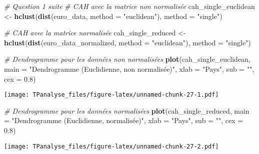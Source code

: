 \documentclass[
]{article}
\newenvironment{Shaded}{\begin{snugshade}}{\end{snugshade}}
\newcommand{\AttributeTok}[1]{\textcolor[rgb]{0.13,0.29,0.53}{#1}}
\newcommand{\CommentTok}[1]{\textcolor[rgb]{0.56,0.35,0.01}{\textit{#1}}}
\newcommand{\FloatTok}[1]{\textcolor[rgb]{0.00,0.00,0.81}{#1}}
\newcommand{\FunctionTok}[1]{\textcolor[rgb]{0.13,0.29,0.53}{\textbf{#1}}}
\newcommand{\NormalTok}[1]{#1}
\newcommand{\OtherTok}[1]{\textcolor[rgb]{0.56,0.35,0.01}{#1}}
\newcommand{\StringTok}[1]{\textcolor[rgb]{0.31,0.60,0.02}{#1}}
\begin{document}
\begin{Shaded}
\begin{Highlighting}[]
\CommentTok{\# Question 1 suite }
\CommentTok{\# CAH avec la matrice non normalisée}
\NormalTok{cah\_single\_euclidean }\OtherTok{\textless{}{-}} \FunctionTok{hclust}\NormalTok{(}\FunctionTok{dist}\NormalTok{(euro\_data, }\AttributeTok{method =} \StringTok{"euclidean"}\NormalTok{), }\AttributeTok{method =} \StringTok{"single"}\NormalTok{)}

\CommentTok{\# CAH avec la matrice normalisée}
\NormalTok{cah\_single\_reduced }\OtherTok{\textless{}{-}} \FunctionTok{hclust}\NormalTok{(}\FunctionTok{dist}\NormalTok{(euro\_data\_normalized, }\AttributeTok{method =} \StringTok{"euclidean"}\NormalTok{), }\AttributeTok{method =} \StringTok{"single"}\NormalTok{)}

\CommentTok{\# Dendrogramme pour les données non normalisées}
\FunctionTok{plot}\NormalTok{(cah\_single\_euclidean, }
     \AttributeTok{main =} \StringTok{"Dendrogramme (Euclidienne, non normalisée)"}\NormalTok{, }
     \AttributeTok{xlab =} \StringTok{"Pays"}\NormalTok{, }\AttributeTok{sub =} \StringTok{""}\NormalTok{, }\AttributeTok{cex =} \FloatTok{0.8}\NormalTok{)}
\end{Highlighting}
\end{Shaded}

\texttt{[image: TPanalyse\_files/figure-latex/unnamed-chunk-27-1.pdf]}

\begin{Shaded}
\begin{Highlighting}[]
\CommentTok{\# Dendrogramme pour les données normalisées}
\FunctionTok{plot}\NormalTok{(cah\_single\_reduced, }
     \AttributeTok{main =} \StringTok{"Dendrogramme (Euclidienne, normalisée)"}\NormalTok{, }
     \AttributeTok{xlab =} \StringTok{"Pays"}\NormalTok{, }\AttributeTok{sub =} \StringTok{""}\NormalTok{, }\AttributeTok{cex =} \FloatTok{0.8}\NormalTok{)}
\end{Highlighting}
\end{Shaded}

\texttt{[image: TPanalyse\_files/figure-latex/unnamed-chunk-27-2.pdf]}
\end{document}
